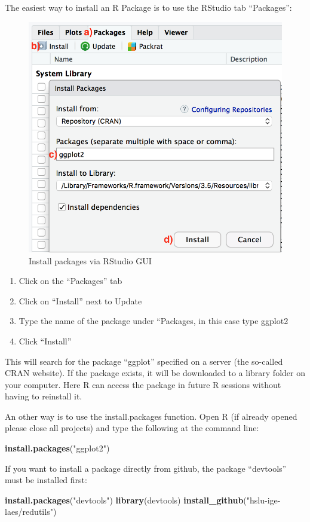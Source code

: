 \documentclass[
]{book}
\newenvironment{Shaded}{\begin{snugshade}}{\end{snugshade}}
\newcommand{\KeywordTok}[1]{\textcolor[rgb]{0.13,0.29,0.53}{\textbf{#1}}}
\newcommand{\NormalTok}[1]{#1}
\newcommand{\StringTok}[1]{\textcolor[rgb]{0.31,0.60,0.02}{#1}}
\let\oldShaded\Shaded
\let\endoldShaded\endShaded
\renewenvironment{Shaded}{\footnotesize\oldShaded}{\endoldShaded}
\begin{document}
The easiest way to install an R Package is to use the RStudio tab ``Packages'':

\begin{figure}
\includegraphics[width=0.5\linewidth]{images/a2-installPackagesRStudio} \caption{Install packages via RStudio GUI}\label{fig:knitr-logo}
\end{figure}

\begin{enumerate}
\def\labelenumi{\alph{enumi})}
\item
  Click on the ``Packages'' tab
\item
  Click on ``Install'' next to Update
\item
  Type the name of the package under ``Packages, in this case type ggplot2
\item
  Click ``Install''
\end{enumerate}

This will search for the package ``ggplot'' specified on a server (the so-called CRAN website). If the package exists, it will be downloaded to a library folder on your computer. Here R can access the package in future R sessions without having to reinstall it.

An other way is to use the install.packages function.
Open R (if already opened please close all projects) and type the following at the command line:

\begin{Shaded}
\begin{Highlighting}[]
\KeywordTok{install.packages}\NormalTok{(}\StringTok{"ggplot2"}\NormalTok{)}
\end{Highlighting}
\end{Shaded}

If you want to install a package directly from github, the package ``devtools'' must be installed first:

\begin{Shaded}
\begin{Highlighting}[]
\KeywordTok{install.packages}\NormalTok{(}\StringTok{"devtools"}\NormalTok{)}
\KeywordTok{library}\NormalTok{(devtools)}
\KeywordTok{install_github}\NormalTok{(}\StringTok{"hslu-ige-laes/redutils"}\NormalTok{)}
\end{Highlighting}
\end{Shaded}
\end{document}
